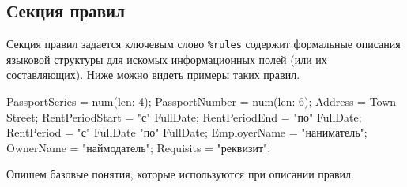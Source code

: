 \subsection{Секция правил}
Секция правил задается ключевым слово \lstinline{%rules} содержит формальные описания языковой структуры для искомых информационных полей (или их составляющих). Ниже можно видеть примеры таких правил.
\begin{Verb}
PassportSeries = num(len: 4);
PassportNumber = num(len: 6);
Address = Town Street;
RentPeriodStart = "с" FullDate;
RentPeriodEnd = "по" FullDate;
RentPeriod = "с" FullDate "по" FullDate;
EmployerName = "наниматель";
OwnerName = "наймодатель";
Requisits = "реквизит";
\end{Verb}

Опишем базовые понятия, которые используются при описании правил.

